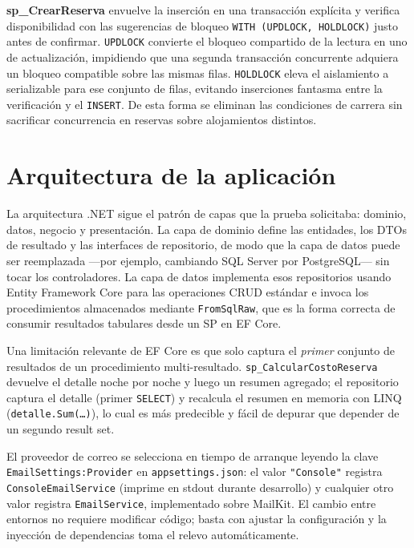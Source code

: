 \documentclass[12pt, letterpaper]{article}
\begin{document}
\textbf{sp\_CrearReserva} envuelve la inserción en una transacción explícita y verifica disponibilidad con las sugerencias de bloqueo \texttt{WITH (UPDLOCK, HOLDLOCK)} justo antes de confirmar. \texttt{UPDLOCK} convierte el bloqueo compartido de la lectura en uno de actualización, impidiendo que una segunda transacción concurrente adquiera un bloqueo compatible sobre las mismas filas. \texttt{HOLDLOCK} eleva el aislamiento a serializable para ese conjunto de filas, evitando inserciones fantasma entre la verificación y el \texttt{INSERT}. De esta forma se eliminan las condiciones de carrera sin sacrificar concurrencia en reservas sobre alojamientos distintos.

\section{Arquitectura de la aplicación}

La arquitectura .NET sigue el patrón de capas que la prueba solicitaba: dominio, datos, negocio y presentación. La capa de dominio define las entidades, los DTOs de resultado y las interfaces de repositorio, de modo que la capa de datos puede ser reemplazada ---por ejemplo, cambiando SQL Server por PostgreSQL--- sin tocar los controladores. La capa de datos implementa esos repositorios usando Entity Framework Core para las operaciones CRUD estándar e invoca los procedimientos almacenados mediante \texttt{FromSqlRaw}, que es la forma correcta de consumir resultados tabulares desde un SP en EF Core.

Una limitación relevante de EF Core es que solo captura el \emph{primer} conjunto de resultados de un procedimiento multi-resultado. \texttt{sp\_CalcularCostoReserva} devuelve el detalle noche por noche y luego un resumen agregado; el repositorio captura el detalle (primer \texttt{SELECT}) y recalcula el resumen en memoria con LINQ (\texttt{detalle.Sum(\ldots)}), lo cual es más predecible y fácil de depurar que depender de un segundo result set.

El proveedor de correo se selecciona en tiempo de arranque leyendo la clave \texttt{EmailSettings:Provider} en \texttt{appsettings.json}: el valor \texttt{"Console"} registra \texttt{ConsoleEmailService} (imprime en stdout durante desarrollo) y cualquier otro valor registra \texttt{EmailService}, implementado sobre MailKit. El cambio entre entornos no requiere modificar código; basta con ajustar la configuración y la inyección de dependencias toma el relevo automáticamente.
\end{document}

